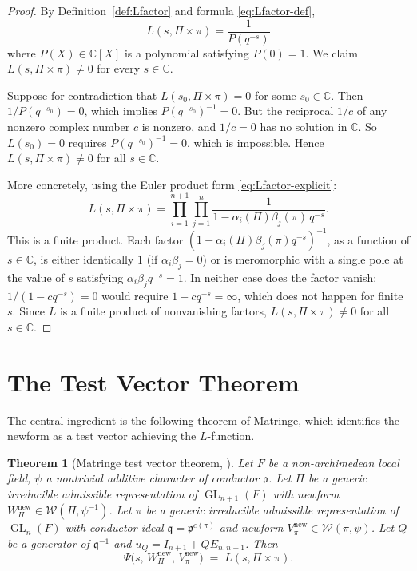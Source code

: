 \documentclass[12pt]{article}
\newtheorem{theorem}{Theorem}
\theoremstyle{definition}
\DeclareMathOperator{\GL}{GL}
\begin{document}
\begin{proof}
By Definition~\ref{def:Lfactor} and formula \eqref{eq:Lfactor-def},
\[
  L(s,\Pi\times\pi) = \frac{1}{P(q^{-s})}
\]
where $P(X) \in \mathbb{C}[X]$ is a polynomial satisfying $P(0) = 1$.
We claim $L(s,\Pi\times\pi) \neq 0$ for every $s \in \mathbb{C}$.

Suppose for contradiction that $L(s_0,\Pi\times\pi) = 0$ for some $s_0 \in \mathbb{C}$.
Then $1/P(q^{-s_0}) = 0$, which implies $P(q^{-s_0})^{-1} = 0$.
But the reciprocal $1/c$ of any nonzero complex number $c$ is nonzero, and
$1/c = 0$ has no solution in $\mathbb{C}$.  So $L(s_0) = 0$ requires $P(q^{-s_0})^{-1}
= 0$, which is impossible.  Hence $L(s,\Pi\times\pi) \neq 0$ for all $s \in \mathbb{C}$.

More concretely, using the Euler product form \eqref{eq:Lfactor-explicit}:
\begin{equation}
  \label{eq:Lfactor-product}
  L(s,\Pi\times\pi)
  = \prod_{i=1}^{n+1}\prod_{j=1}^{n} \frac{1}{1 - \alpha_i(\Pi)\beta_j(\pi)\,q^{-s}}.
\end{equation}
This is a finite product.  Each factor $(1 - \alpha_i(\Pi)\beta_j(\pi) q^{-s})^{-1}$,
as a function of $s \in \mathbb{C}$, is either identically $1$ (if $\alpha_i\beta_j = 0$)
or is meromorphic with a single pole at the value of $s$ satisfying $\alpha_i\beta_j q^{-s} = 1$.
In neither case does the factor vanish: $1/(1-c q^{-s}) = 0$ would require $1 - c q^{-s} =
\infty$, which does not happen for finite $s$.  Since $L$ is a finite product of nonvanishing
factors, $L(s,\Pi\times\pi) \neq 0$ for all $s \in \mathbb{C}$.
\end{proof}

\section{The Test Vector Theorem}
\label{sec:testvector}

The central ingredient is the following theorem of Matringe, which identifies
the newform as a test vector achieving the $L$-function.

\begin{theorem}[Matringe test vector theorem, \cite{Mat13}]
\label{thm:Matringe}
Let $F$ be a non-archimedean local field, $\psi$ a nontrivial additive
character of conductor $\mathfrak{o}$.  Let $\Pi$ be a generic irreducible
admissible representation of $\GL_{n+1}(F)$ with newform $W_\Pi^{\mathrm{new}}
\in \mathcal{W}(\Pi,\psi^{-1})$.  Let $\pi$ be a generic irreducible admissible
representation of $\GL_n(F)$ with conductor ideal $\mathfrak{q} = \mathfrak{p}^{c(\pi)}$
and newform $V_\pi^{\mathrm{new}} \in \mathcal{W}(\pi,\psi)$.  Let $Q$ be a
generator of $\mathfrak{q}^{-1}$ and $u_Q = I_{n+1} + Q E_{n,n+1}$.  Then
\begin{equation}
  \label{eq:test-vector}
  \Psi\!\bigl(s,\, W_\Pi^{\mathrm{new}},\, V_\pi^{\mathrm{new}}\bigr)
  \;=\; L(s,\Pi\times\pi).
\end{equation}
\end{theorem}
\end{document}

